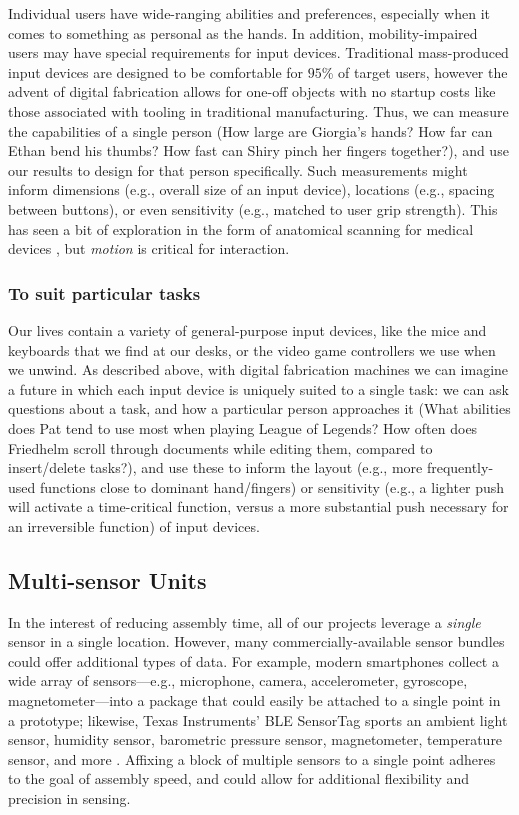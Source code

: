     Individual users have wide-ranging abilities and preferences, especially when it comes to something as personal as the hands. In addition, mobility-impaired users may have special requirements for input devices. Traditional mass-produced input devices are designed to be comfortable for $95$\% of target users, however the advent of digital fabrication allows for one-off objects with no startup costs like those associated with tooling in traditional manufacturing. Thus, we can measure the capabilities of a single person (How large are Giorgia's hands? How far can Ethan bend his thumbs? How fast can Shiry pinch her fingers together?), and use our results to design for that person specifically. Such measurements might inform dimensions (e.g., overall size of an input device), locations (e.g., spacing between buttons), or even sensitivity (e.g., matched to user grip strength). This has seen a bit of exploration in the form of anatomical scanning for medical devices \cite{smakman-curatio}, but \emph{motion} is critical for interaction.

    \subsubsection{To suit particular tasks}
    
    Our lives contain a variety of general-purpose input devices, like the mice and keyboards that we find at our desks, or the video game controllers we use when we unwind. As described above, with digital fabrication machines we can imagine a future in which each input device is uniquely suited to a single task: we can ask questions about a task, and how a particular person approaches it (What abilities does Pat tend to use most when playing League of Legends? How often does Friedhelm scroll through documents while editing them, compared to insert/delete tasks?), and use these to inform the layout (e.g., more frequently-used functions close to dominant hand/fingers) or sensitivity (e.g., a lighter push will activate a time-critical function, versus a more substantial push necessary for an irreversible function) of input devices.
    
\subsection{Multi-sensor Units}

In the interest of reducing assembly time, all of our projects leverage a \emph{single} sensor in a single location. However, many commercially-available sensor bundles could offer additional types of data. For example, modern smartphones collect a wide array of sensors---e.g., microphone, camera, accelerometer, gyroscope, magnetometer---into a package that could easily be attached to a single point in a prototype; likewise, Texas Instruments' BLE SensorTag sports an ambient light sensor, humidity sensor, barometric pressure sensor, magnetometer, temperature sensor, and more \cite{ti-sensortag}. Affixing a block of multiple sensors to a single point adheres to the goal of assembly speed, and could allow for additional flexibility and precision in sensing.

